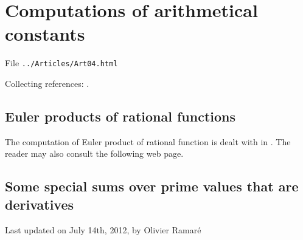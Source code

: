 \chapter{   Computations of arithmetical constants}

File \texttt{../Articles/Art04.html}









Collecting references:
\cite{Cazaran-Moree*99}.

 
 


\section{Euler products of rational functions
}


The computation of Euler product of rational function is dealt with in
\cite{Moree*12}. The reader may
also consult the following
web page.


\section{Some special sums over prime values that are derivatives
}









  
  Last updated on July 14th, 2012, by Olivier Ramar\'e

















